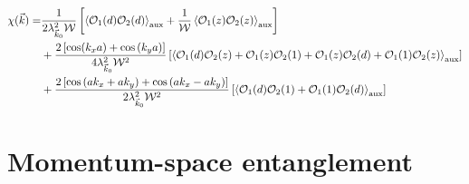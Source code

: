 \documentclass{report}
\numberwithin{equation}{section}
\begin{document}
\begin{equation}\begin{aligned}
	\chi(\vec k)=& \frac{1}{2\lambda_{\vec k_0}^2 \mathcal{W}}\left[\braket{\mathcal{O}_1(d) \mathcal{O}_2(d)}_\text{aux} + \frac{1}{\mathcal{W}}\braket{\mathcal{O}_1(z) \mathcal{O}_2(z)}_\text{aux}\right]\\
		    &+ \frac{2\left[\cos(k_x a) + \cos\left(k_y a\right)\right]}{4\lambda_{\vec k_0}^2 \mathcal{W}^2}\left[\braket{\mathcal{O}_1(d) \mathcal{O}_2(z) + \mathcal{O}_1(z) \mathcal{O}_2(1) + \mathcal{O}_1(z) \mathcal{O}_2(d) + \mathcal{O}_1(1) \mathcal{O}_2(z)}_\text{aux}\right] \\
		    &+ \frac{2\left[\cos \left(ak_x + ak_y\right) + \cos \left( ak_x - ak_y \right) \right]}{2\lambda_{\vec k_0}^2 \mathcal{W}^2}\left[\braket{\mathcal{O}_1(d) \mathcal{O}_2(1) + \mathcal{O}_1(1) \mathcal{O}_2(d)}_\text{aux}\right] 
\end{aligned}\end{equation}

\section{Momentum-space entanglement}
\end{document}
